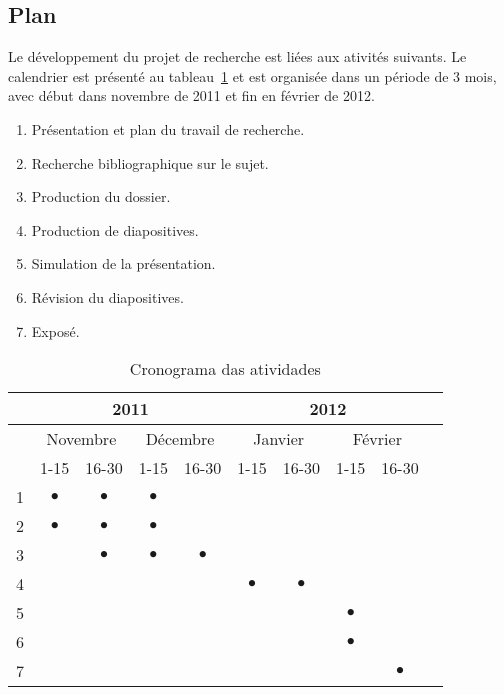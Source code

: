\documentclass[a4paper,12pt]{article}
\begin{document}
\titleTMB 
\newpage

\subsection*{Plan}
\label{subsec:cronograma}
Le développement du projet de recherche est liées aux ativités suivants. Le
calendrier est présenté au tableau~\ref{tab:cronograma} et est organisée dans un
période de 3 mois, avec début dans novembre de 2011 et fin en février de 2012.

\begin{enumerate}
\item Présentation et plan du travail de recherche.
\item Recherche bibliographique sur le sujet.
\item Production du dossier.
\item Production de diapositives.
\item Simulation de la présentation.
\item Révision du diapositives.
\item Exposé.

\end{enumerate}

\begin{table}[h]
\caption{Cronograma das atividades}
\begin{center} {
  \begin{tabular}{ |c|c|c|c|c|c|c|c|c|c|}
      \hline
      & \multicolumn{4}{|c|}{2011} & \multicolumn{4}{|c|}{2012}\\ \hline
      \hline
      &   \multicolumn{2}{|c|}{Novembre}   &  \multicolumn{2}{|c|}{Décembre}& \multicolumn{2}{|c|}{Janvier} & \multicolumn{2}{|c|}{Février} \\ \hline
      \hline
      & 1-15 & 16-30 & 1-15 & 16-30 & 1-15 & 16-30 & 1-15 & 16-30 \\ \hline
      1 & $\bullet$ & $\bullet$ & $\bullet$ & & & & & \\ \hline
      2 & $\bullet$ & $\bullet$ & $\bullet$ & & & & & \\ \hline
      3 &  & $\bullet$ & $\bullet$ & $\bullet$& & & & \\ \hline
      4 & & & & & $\bullet$ & $\bullet$& & \\ \hline
      5 & & & & & & & $\bullet$ & \\ \hline
      6 & & & & & & & $\bullet$ & \\ \hline
      7 & & & & & & & & $\bullet$\\ \hline

    \end{tabular}
  }\end{center}
\label{tab:cronograma}
\end{table}
\end{document}
